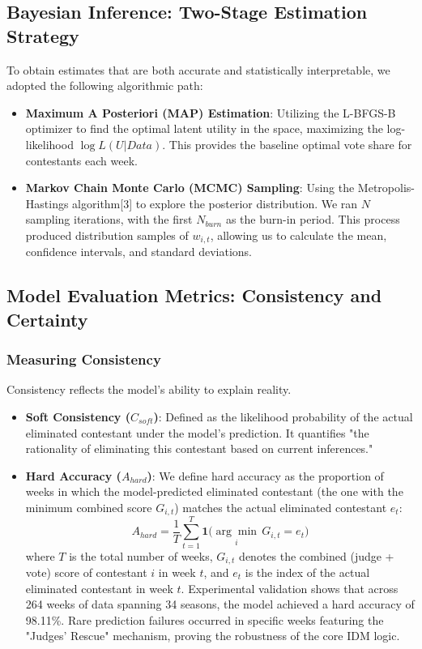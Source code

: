 \documentclass[12pt]{article}
\begin{document}
	\subsection{Bayesian Inference: Two-Stage Estimation Strategy}
	To obtain estimates that are both accurate and statistically interpretable, we adopted the following algorithmic path:
	\begin{itemize}
		\item \textbf{Maximum A Posteriori (MAP) Estimation}: Utilizing the L-BFGS-B optimizer to find the optimal latent utility in the space, maximizing the log-likelihood $\log L(U|Data)$. This provides the baseline optimal vote share for contestants each week.
		\item \textbf{Markov Chain Monte Carlo (MCMC) Sampling}: Using the Metropolis-Hastings algorithm[3] to explore the posterior distribution. We ran $N$ sampling iterations, with the first $N_{burn}$ as the burn-in period. This process produced distribution samples of $w_{i,t}$, allowing us to calculate the mean, confidence intervals, and standard deviations.
	\end{itemize}
	
	\subsection{Model Evaluation Metrics: Consistency and Certainty}
	\subsubsection{Measuring Consistency}
	Consistency reflects the model's ability to explain reality.
	\begin{itemize}
		\item \textbf{Soft Consistency ($C_{soft}$)}: Defined as the likelihood probability of the actual eliminated contestant under the model's prediction. It quantifies "the rationality of eliminating this contestant based on current inferences."
		\item \textbf{Hard Accuracy ($A_{hard}$)}: We define hard accuracy as the proportion of weeks in which the model-predicted eliminated contestant (the one with the minimum combined score $G_{i,t}$) matches the actual eliminated contestant $e_t$:
		$$A_{hard} = \frac{1}{T} \sum_{t=1}^{T} \mathbf{1}\Big(\underset{i}{\arg\min}\, G_{i,t} = e_t\Big)$$
		where $T$ is the total number of weeks, $G_{i,t}$ denotes the combined (judge + vote) score of contestant $i$ in week $t$, and $e_t$ is the index of the actual eliminated contestant in week $t$. Experimental validation shows that across 264 weeks of data spanning 34 seasons, the model achieved a hard accuracy of 98.11\%. Rare prediction failures occurred in specific weeks featuring the "Judges' Rescue" mechanism, proving the robustness of the core IDM logic.
	\end{itemize}
	
\end{document}
